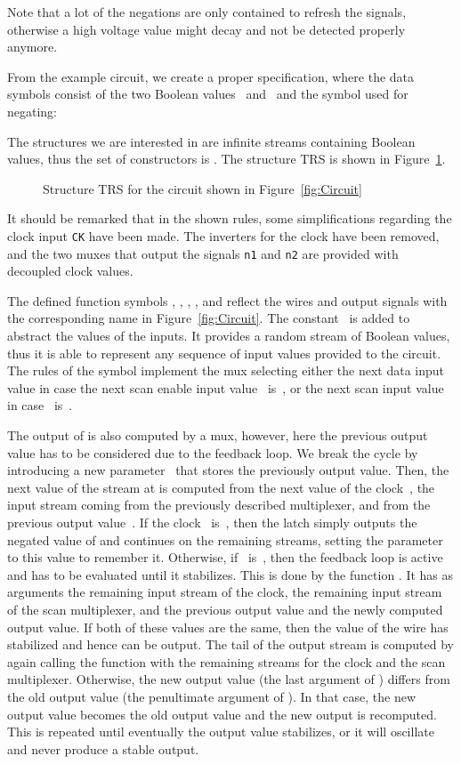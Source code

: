 \documentclass{eptcs}
\begin{document}
Note that a lot of the negations are only contained to refresh the signals,
otherwise a high voltage value might decay and not be detected properly anymore.

From the example circuit, we create a proper specification, where the data
symbols consist of the two Boolean values~ and~ and the symbol
 used for negating:


The structures we are interested in are infinite streams containing Boolean
values, thus the set of constructors is . The structure
TRS  is shown in Figure~\ref{fig:HWrules}.

\begin{figure}[t]
\centering

\caption{Structure TRS  for the circuit shown in Figure~\ref{fig:Circuit}}
\label{fig:HWrules}
\end{figure}

It should be remarked that in the shown rules, some simplifications regarding
the clock input \texttt{CK} have been made. The inverters for the clock have
been removed, and the two muxes that output the signals \texttt{n1} and
\texttt{n2} are provided with decoupled clock values.

The defined function symbols , , ,
, and  reflect the wires and output signals with the
corresponding name in Figure~\ref{fig:Circuit}.
The constant~ is added to abstract the values of the inputs. It
provides a random stream of Boolean values, thus it is able to represent any
sequence of input values provided to the circuit.
The rules of the symbol  implement the mux selecting either the
next data input value  in case the next scan enable input value~ is~,
or the next scan input value  in case~ is~.

The output of  is also computed by a mux, however, here the previous
output value has to be considered due to the feedback loop. We break the cycle
by introducing a new parameter~ that stores the previously output
value.
Then, the next value of the stream at  is computed
from the next value of the clock~, the input stream
 coming from the previously described
multiplexer, and from the previous output value~.
If the clock~ is~, then the latch simply outputs the negated value of
 and continues on the remaining streams, setting the
parameter~ to this value to remember it.
Otherwise, if~ is~, then the feedback loop is active and has to be
evaluated until it stabilizes. This is done by the function .
It has as arguments the remaining input stream of the clock, the remaining input
stream of the scan multiplexer, and the previous output value and the newly
computed output value. If both of these values are the same, then the value of
the wire  has stabilized and hence can be output. The tail of the
output stream is computed by again calling the function  with the
remaining streams for the clock and the scan multiplexer.
Otherwise, the new output value (the last argument of ) differs from
the old output value (the penultimate argument of ). In that case,
the new output value becomes the old output value and the new output is
recomputed. This is repeated until eventually the output value stabilizes, or it
will oscillate and never produce a stable output.
\end{document}

